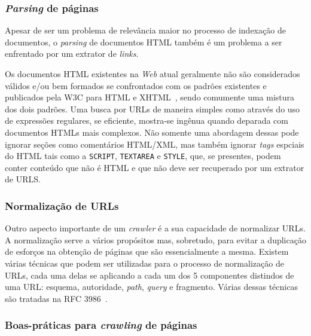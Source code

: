 \documentclass[10pt,twocolumn]{article}
\begin{document}
\subsubsection{\emph{Parsing} de páginas}

Apesar de ser um problema de relevância maior no processo de indexação
de documentos, o \emph{parsing} de documentos HTML também é um problema
a ser enfrentado por um extrator de \emph{links}.

Os documentos HTML existentes na \emph{Web} atual geralmente não são
considerados válidos
e/ou bem formados se confrontados com os padrões existentes e publicados
pela W3C para HTML e XHTML~\cite{html4tr, bray2006xml}, sendo comumente
uma mistura dos dois padrões. Uma busca por URLs de maneira simples como
através do uso de expressões regulares, se eficiente, mostra-se ingênua
quando deparada com documentos HTMLs mais complexos. Não somente uma
abordagem dessas pode ignorar seções como comentários HTML/XML, mas
também ignorar \emph{tags} espciais do HTML tais como a \texttt{SCRIPT},
\texttt{TEXTAREA} e \texttt{STYLE}, que, se presentes, podem conter
conteúdo que não é HTML e que não deve ser recuperado por um extrator de
URLS.

\subsubsection{Normalização de URLs}\label{prob:urlnorm}

Outro aspecto importante de um \emph{crawler} é a sua capacidade de
normalizar URLs. A normalização serve a vários propósitos mas, sobretudo, para
evitar a duplicação de esforços na obtenção de páginas que são
essencialmente a mesma. Existem várias técnicas que podem ser utilizadas
para o processo de normalização de URLs, cada uma delas se aplicando a
cada um dos 5 componentes distindos de uma URL: esquema, autoridade,
\emph{path}, \emph{query} e fragmento. Várias dessas técnicas são
tratadas na RFC 3986~\cite{rfc3986}.


\subsubsection{Boas-práticas para \emph{crawling} de
páginas}\label{prob:robots}
\end{document}
